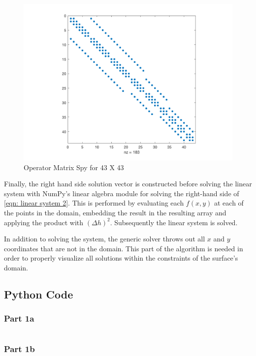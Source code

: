 \documentclass[10pt,a4paper]{article}
\begin{document}
\begin{figure}[H]
\center
\includegraphics[scale=0.3]{figures/p1b_diagonal.png}
\caption{Operator Matrix Spy for 43 X 43}
\label{fig: operator matrix}
\end{figure}

Finally, the right hand side solution vector is constructed before solving the linear system with NumPy's linear algebra module for solving the right-hand side of \cref{eqn: linear system 2}. This is performed by evaluating each $f(x,y)$ at each of the  points in the domain, embedding the result in the resulting array and applying the product with $\left( \Delta h \right)^2$. Subsequently the linear system is solved.

In addition to solving the system, the generic solver throws out all $x$ and $y$ coordinates that are not in the domain. This part of the algorithm is needed in order to properly visualize all solutions within the constraints of the surface's domain.

\subsection*{Python Code}

\subsubsection{Part 1a}

 
\inputminted{python}{code/part_one_solver.py}


\subsubsection{Part 1b}
\end{document}
